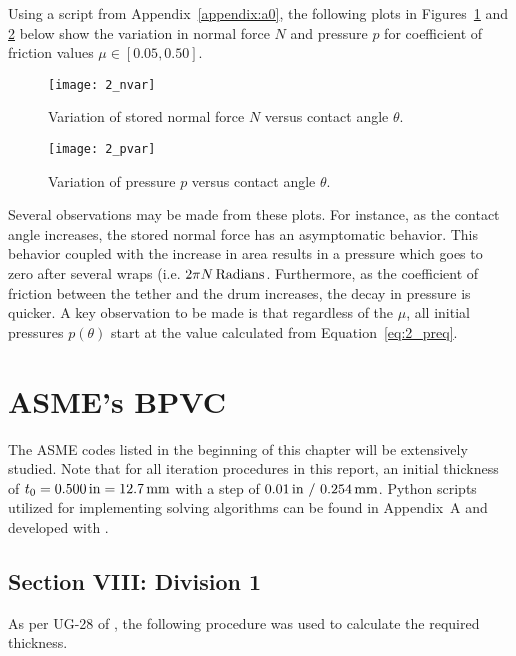 Using a \cite{PYTHON} script from Appendix~\ref{appendix:a0}, the following plots in Figures~\ref{fig:2_nvar} and \ref{fig:2_pvar} below show the variation in normal force $N$ and pressure $p$ for coefficient of friction values $\mu \in [0.05, 0.50]$.

\begin{figure}[H]
	\centering
	\texttt{[image: 2\_nvar]}
	\caption{Variation of stored normal force $N$ versus contact angle $\theta$.}
	\label{fig:2_nvar}
\end{figure}

\begin{figure}[H]
	\centering
	\texttt{[image: 2\_pvar]}
	\caption{Variation of pressure $p$ versus contact angle $\theta$.}
	\label{fig:2_pvar}
\end{figure}

Several observations may be made from these plots. For instance, as the contact angle increases, the stored normal force has an asymptomatic behavior. This behavior coupled with the increase in area results in a pressure which goes to zero after several wraps (i.e. $2 \pi N \,\mathrm{Radians}$. Furthermore, as the coefficient of friction between the tether and the drum increases, the decay in pressure is quicker. A key observation to be made is that regardless of the $\mu$, all initial pressures $p(\theta)$ start at the value calculated from Equation~\ref{eq:2_preq}.  

\section{ASME's BPVC}

The ASME codes listed in the beginning of this chapter will be extensively studied. Note that for all iteration procedures in this report, an initial thickness of $t_0 =0.500\,\mathrm{in}= 12.7 \,\mathrm{mm}$ with a step of  $0.01\,\mathrm{in} \ / \ 0.254\,\mathrm{mm}$. Python scripts utilized for implementing solving algorithms can be found in Appendix~A and developed with \cite{PYTHON}. 
\subsection{Section VIII: Division 1}
\label{section:2_VIII1}
As per UG-28 of \cite{ASMEbvpcVII1}, the following procedure was used to calculate the required thickness.

